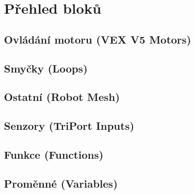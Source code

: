 \newcommand{\where}[1]{{\normalfont (#1)}}

\section{Přehled bloků}

\subsection*{Ovládání motoru \where{VEX V5 Motors}}
\begin{itemize}
	\blockMotorStart
	\blockMotorStop
	\blockMotorDistance
	\blockMotorVelocity
\end{itemize}

\subsection*{Smyčky \where{Loops}}
\begin{itemize}
	\blockLoop
	\blockLoopForever
	\blockLoopWhile
\end{itemize}

\subsection*{Ostatní \where{Robot Mesh}}
\begin{itemize}
	\blockStart
	\blockMotorDone
	\blockWait
	\blockWaitUntil
	\blockComment
\end{itemize}

\subsection*{Senzory \where{TriPort Inputs}}
\begin{itemize}
	\blockBumperPressed
\end{itemize}

\subsection*{Funkce \where{Functions}}
\begin{itemize}
	\blockFunctionDefinition
	\blockFunctionCall
\end{itemize}

\subsection*{Proměnné \where{Variables}}
\begin{itemize}
	\blockVariableCreate
	\blockVariableChange
	\blockVariableGet
	\blockVariableSet
\end{itemize}

